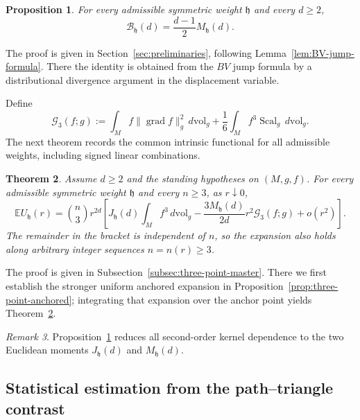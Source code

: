 \documentclass[11pt]{article}
\newtheorem{theorem}{Theorem}[section]
\newtheorem{proposition}[theorem]{Proposition}
\theoremstyle{remark}
\newtheorem{remark}[theorem]{Remark}
\newcommand{\Scal}{\operatorname{Scal}}
\newcommand{\grad}{\operatorname{grad}}
\newcommand{\E}{\mathbb E}
\numberwithin{equation}{section}
\begin{document}
\begin{proposition}
\label{prop:universal-boundary-moment}
For every admissible symmetric weight $\mathfrak h$ and every $d\ge2$,
\[
\mathcal B_{\mathfrak h}(d)
=
\frac{d-1}{2}M_{\mathfrak h}(d).
\]
\end{proposition}

The proof is given in Section~\ref{sec:preliminaries}, following
Lemma~\ref{lem:BV-jump-formula}.  There the identity is obtained from the
$BV$ jump formula by a distributional divergence argument in the
displacement variable.

Define
\[
\mathcal G_3(f;g):=
\int_M f\|\grad f\|_g^2\,d\mathrm{vol}_g
+\frac16\int_M f^3\Scal_g\,d\mathrm{vol}_g.
\]
The next theorem records the common intrinsic functional for all admissible
weights, including signed linear combinations.

\begin{theorem}
\label{thm:three-point-master}
Assume $d\ge2$ and the standing hypotheses on $(M,g,f)$.
For every admissible symmetric weight $\mathfrak h$ and every $n\ge3$,
as $r\downarrow0$,
\[
\E U_{\mathfrak h}(r)
=
\binom n3 r^{2d}
\left[
J_{\mathfrak h}(d)\int_M f^3\,d\mathrm{vol}_g
-\frac{3M_{\mathfrak h}(d)}{2d}r^2\mathcal G_3(f;g)
+o(r^2)
\right].
\]
The remainder in the bracket is independent of $n$, so the expansion
also holds along arbitrary integer sequences $n=n(r)\ge3$.
\end{theorem}

The proof is given in Subsection~\ref{subsec:three-point-master}.
There we first establish the stronger uniform anchored expansion in
Proposition~\ref{prop:three-point-anchored}; integrating that expansion
over the anchor point yields Theorem~\ref{thm:three-point-master}.

\begin{remark}
Proposition~\ref{prop:universal-boundary-moment} reduces all second-order
kernel dependence to the two Euclidean moments
$J_{\mathfrak h}(d)$ and $M_{\mathfrak h}(d)$.
\end{remark}


\subsection{Statistical estimation from the path--triangle contrast}
\label{subsec:statistical-statements}
\end{document}
